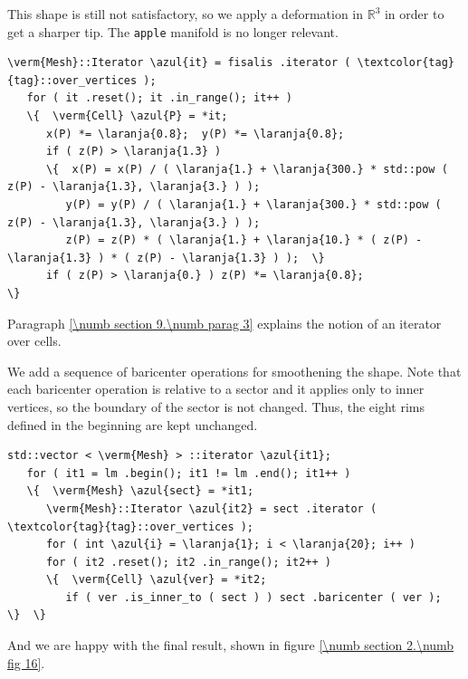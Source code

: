 This shape is still not satisfactory, so we apply a deformation in $ \mathbb{R}^3 $ in order to
get a sharper tip.
The {\small\tt apple} manifold is no longer relevant.

\begin{Verbatim}[commandchars=\\\{\},formatcom=\small\tt,frame=single,
   label=parag-\ref{\numb section 2.\numb parag 13}.cpp,rulecolor=\color{coment},
   baselinestretch=0.94,framesep=2mm]
   \verm{Mesh}::Iterator \azul{it} = fisalis .iterator ( \textcolor{tag}{tag}::over_vertices );
   for ( it .reset(); it .in_range(); it++ )
   \{  \verm{Cell} \azul{P} = *it;
      x(P) *= \laranja{0.8};  y(P) *= \laranja{0.8};
      if ( z(P) > \laranja{1.3} )
      \{  x(P) = x(P) / ( \laranja{1.} + \laranja{300.} * std::pow ( z(P) - \laranja{1.3}, \laranja{3.} ) );
         y(P) = y(P) / ( \laranja{1.} + \laranja{300.} * std::pow ( z(P) - \laranja{1.3}, \laranja{3.} ) );
         z(P) = z(P) * ( \laranja{1.} + \laranja{10.} * ( z(P) - \laranja{1.3} ) * ( z(P) - \laranja{1.3} ) );  \}
      if ( z(P) > \laranja{0.} ) z(P) *= \laranja{0.8};                                        \}
\end{Verbatim}

Paragraph \ref{\numb section 9.\numb parag 3} explains the notion of an iterator over cells.

We add a sequence of baricenter operations for smoothening the shape.
Note that each baricenter operation is relative to a sector and it applies only to inner
vertices, so the boundary of the sector is not changed.
Thus, the eight rims defined in the beginning are kept unchanged.

\begin{Verbatim}[commandchars=\\\{\},formatcom=\small\tt,frame=single,
   label=parag-\ref{\numb section 2.\numb parag 13}.cpp,rulecolor=\color{coment},
   baselinestretch=0.94,framesep=2mm]
   std::vector < \verm{Mesh} > ::iterator \azul{it1};
   for ( it1 = lm .begin(); it1 != lm .end(); it1++ )
   \{  \verm{Mesh} \azul{sect} = *it1;
      \verm{Mesh}::Iterator \azul{it2} = sect .iterator ( \textcolor{tag}{tag}::over_vertices );
      for ( int \azul{i} = \laranja{1}; i < \laranja{20}; i++ )
      for ( it2 .reset(); it2 .in_range(); it2++ )
      \{  \verm{Cell} \azul{ver} = *it2;
         if ( ver .is_inner_to ( sect ) ) sect .baricenter ( ver );  \}  \}
\end{Verbatim}

And we are happy with the final result, shown in figure \ref{\numb section 2.\numb fig 16}.

